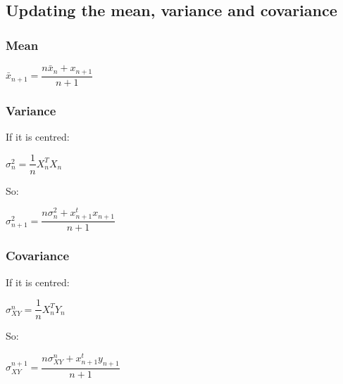 
\subsection{Updating the mean, variance and covariance}

\subsubsection{Mean}

\(\bar x_{n+1} = \dfrac{n\bar x_n+x_{n+1}}{n+1}\)

\subsubsection{Variance}

If it is centred:

\(\sigma_n^2=\dfrac{1}{n}X_n^TX_n\)

So:

\(\sigma_{n+1}^2=\dfrac{n\sigma_n^2 +x_{n+1}^tx_{n+1}}{n+1}\)

\subsubsection{Covariance}

If it is centred:

\(\sigma_{XY}^n=\dfrac{1}{n}X_n^TY_n\)

So:

\(\sigma_{XY}^{n+1}=\dfrac{n\sigma^n_{XY}+x_{n+1}^ty_{n+1}}{n+1}\)

